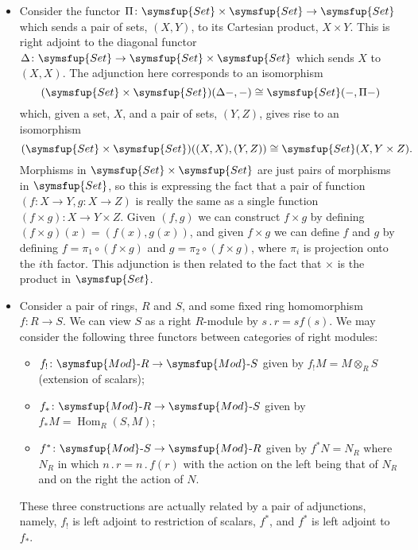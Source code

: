 \documentclass[fleqn]{NotesClass}
\makeatletter
\newcommand{\c@egory}[1]{\symsfup{#1}}
\newcommand{\Set}{\c@egory{Set}}
\newcommand{\ModR}[1][R]{\c@egory{Mod}\text{-}#1}
\newcommand{\isomorphic}{\cong}
\newcommand{\action}{\mathbin{.}}
\DeclareMathOperator{\Hom}{Hom}
\makeatother
\begin{document}
\begin{exm}{}{}
\begin{itemize}
            \item Consider the functor \(\Pi \colon \Set \times \Set \to \Set\) which sends a pair of sets, \((X, Y)\), to its Cartesian product, \(X \times Y\).
            This is right adjoint to the diagonal functor \(\Delta \colon \Set \to \Set \times \Set\) which sends \(X\) to \((X, X)\).
            The adjunction here corresponds to an isomorphism
            \begin{equation}
                (\Set \times \Set)(\Delta-, -) \isomorphic \Set(-, \Pi-)
            \end{equation}
            which, given a set, \(X\), and a pair of sets, \((Y, Z)\), gives rise to an isomorphism
            \begin{equation}
                (\Set \times \Set)((X, X), (Y, Z)) \isomorphic \Set(X, Y \times Z).
            \end{equation}
            Morphisms in \(\Set\times \Set\) are just pairs of morphisms in \(\Set\), so this is expressing the fact that a pair of function \((f \colon X \to Y, g \colon X \to Z)\) is really the same as a single function \((f \times g) \colon X \to Y \times Z\).
            Given \((f, g)\) we can construct \(f \times g\) by defining \((f \times g)(x) = (f(x), g(x))\), and given \(f \times g\) we can define \(f\) and \(g\) by defining \(f = \pi_1 \circ (f \times g)\) and \(g = \pi_2 \circ (f \times g)\), where \(\pi_i\) is projection onto the \(i\)th factor.
            This adjunction is then related to the fact that \(\times\) is the product in \(\Set\).
            
            \item Consider a pair of rings, \(R\) and \(S\), and some fixed ring homomorphism \(f \colon R \to S\).
            We can view \(S\) as a right \(R\)-module by \(s \action r = sf(s)\).
            We may consider the following three functors between categories of right modules:
            \begin{itemize}
                \item \(f_! \colon \ModR \to \ModR[S]\) given by \(f_!M = M \otimes_R S\) (extension of scalars);
                \item \(f_* \colon \ModR \to \ModR[S]\) given by \(f_*M = \Hom_R(S, M)\);
                \item \(f^* \colon \ModR[S] \to \ModR\) given by \(f^*N = N_R\) where \(N_R\) in which \(n \action r = n \action f(r)\) with the action on the left being that of \(N_R\) and on the right the action of \(N\).
            \end{itemize}
            These three constructions are actually related by a pair of adjunctions, namely, \(f_!\) is left adjoint to restriction of scalars, \(f^*\), and \(f^*\) is left adjoint to \(f_*\).
            

\end{itemize}
\end{exm}
\end{document}
